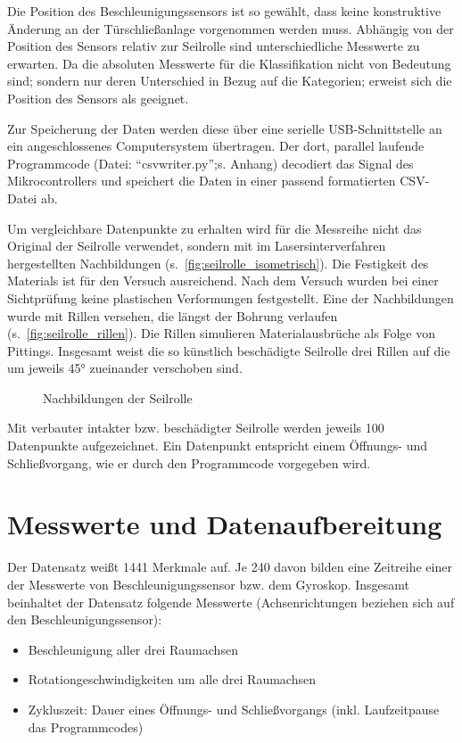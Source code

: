 Die Position des Beschleunigungssensors ist so gewählt, dass keine konstruktive Änderung an der Türschließanlage vorgenommen werden muss. Abhängig von der Position des Sensors relativ zur Seilrolle sind unterschiedliche Messwerte zu erwarten. Da die absoluten Messwerte für die Klassifikation nicht von Bedeutung sind; sondern nur deren Unterschied in Bezug auf die Kategorien; erweist sich die Position des Sensors als geeignet.

Zur Speicherung der Daten werden diese über eine serielle USB-Schnittstelle an ein angeschlossenes Computersystem übertragen. Der dort, parallel laufende Programmcode (Datei: \enquote{csvwriter.py};s. Anhang) decodiert das Signal des Mikrocontrollers und speichert die Daten in einer passend formatierten CSV-Datei ab.

Um vergleichbare Datenpunkte zu erhalten wird für die Messreihe nicht das Original der Seilrolle verwendet, sondern mit im Lasersinterverfahren hergestellten Nachbildungen (s.~\cref{fig:seilrolle_isometrisch}). Die Festigkeit des Materials ist für den Versuch ausreichend. Nach dem Versuch wurden bei einer Sichtprüfung keine plastischen Verformungen festgestellt. Eine der Nachbildungen wurde mit Rillen versehen, die längst der Bohrung verlaufen (s.~\cref{fig:seilrolle_rillen}). Die Rillen simulieren Materialausbrüche als Folge von Pittings. Insgesamt weist die so künstlich beschädigte Seilrolle drei Rillen auf die um jeweils 45° zueinander verschoben sind.

\begin{figure}[ht]
	\centering
	\qquad
	\caption{Nachbildungen der Seilrolle}
	\label{fig:cad_seilrolle}
\end{figure}

Mit verbauter intakter bzw. beschädigter Seilrolle werden jeweils 100 Datenpunkte aufgezeichnet. Ein Datenpunkt entspricht einem Öffnungs- und Schließvorgang, wie er durch den Programmcode vorgegeben wird.
\section{Messwerte und Datenaufbereitung}
\label{sec:messdaten}
Der Datensatz weißt \num{1441} Merkmale auf. Je \num{240} davon bilden eine Zeitreihe einer der Messwerte von Beschleunigungssensor bzw. dem Gyroskop. Insgesamt beinhaltet der Datensatz folgende Messwerte (Achsenrichtungen beziehen sich auf den Beschleunigungssensor):
\begin{itemize}
	\item Beschleunigung aller drei Raumachsen
	\item Rotationgeschwindigkeiten um alle drei Raumachsen
	\item Zykluszeit: Dauer eines Öffnungs- und Schließvorgangs (inkl. Laufzeitpause das Programmcodes)
\end{itemize}


